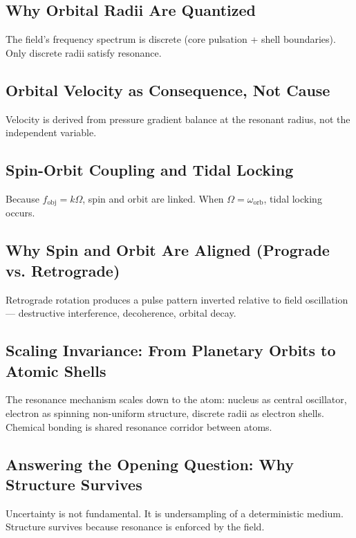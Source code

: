\documentclass[12pt, a4paper]{article}
\begin{document}
\subsection{Why Orbital Radii Are Quantized}

The field's frequency spectrum is discrete (core pulsation + shell boundaries). Only discrete radii satisfy resonance.

\subsection{Orbital Velocity as Consequence, Not Cause}

Velocity is derived from pressure gradient balance at the resonant radius, not the independent variable.

\subsection{Spin-Orbit Coupling and Tidal Locking}

Because \( f_{\text{obj}} = k\Omega \), spin and orbit are linked. When \( \Omega = \omega_{\text{orb}} \), tidal locking occurs.

\subsection{Why Spin and Orbit Are Aligned (Prograde vs. Retrograde)}

Retrograde rotation produces a pulse pattern inverted relative to field oscillation — destructive interference, decoherence, orbital decay.

\subsection{Scaling Invariance: From Planetary Orbits to Atomic Shells}

The resonance mechanism scales down to the atom: nucleus as central oscillator, electron as spinning non-uniform structure, discrete radii as electron shells. Chemical bonding is shared resonance corridor between atoms.

\subsection{Answering the Opening Question: Why Structure Survives}

Uncertainty is not fundamental. It is undersampling of a deterministic medium. Structure survives because resonance is enforced by the field.
\end{document}
